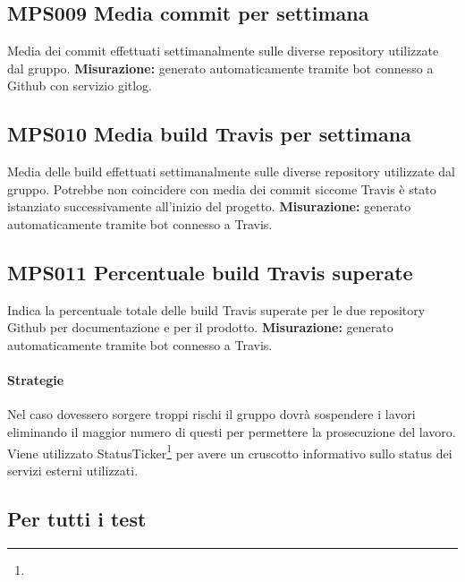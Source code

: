\documentclass[NormeDiProgetto.tex]{subfiles}
\begin{document}
\subsection{MPS009 Media commit per settimana} Media dei commit effettuati settimanalmente sulle diverse repository utilizzate dal gruppo.
\textbf{Misurazione:} generato automaticamente tramite bot connesso a Github con servizio gitlog.
\subsection{MPS010 Media build Travis per settimana} Media delle build effettuati settimanalmente sulle diverse repository utilizzate dal gruppo. Potrebbe non coincidere con media dei commit siccome Travis è stato istanziato successivamente all'inizio del progetto.
\textbf{Misurazione:} generato automaticamente tramite bot connesso a Travis. 
\subsection{MPS011 Percentuale build Travis superate} Indica la percentuale totale delle build Travis superate per le due repository Github per documentazione e per il prodotto. 
\textbf{Misurazione:} generato automaticamente tramite bot connesso a Travis. 

\paragraph{Strategie}
Nel caso dovessero sorgere troppi rischi il gruppo dovrà sospendere i lavori eliminando il maggior numero di questi per permettere la prosecuzione del lavoro.
Viene utilizzato StatusTicker\footnote{} per avere un cruscotto informativo sullo status dei servizi esterni utilizzati.


\subsection{Per tutti i test}
\end{document}
